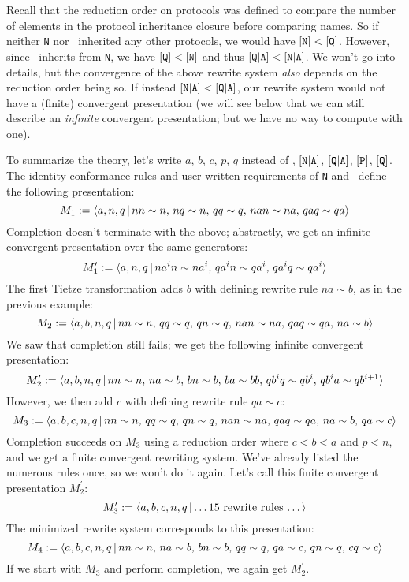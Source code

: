 \documentclass[../generics]{subfiles}
\begin{document}
\begin{example}
Recall that the reduction order on protocols was defined to compare the number of elements in the protocol inheritance closure before comparing names. So if neither \texttt{N} nor \tQ\ inherited any other protocols, we would have $[\texttt{N}]<[\texttt{Q}]$. However, since \tQ\ inherits from \texttt{N}, we have $[\texttt{Q}]<[\texttt{N}]$ and thus $[\texttt{Q}|\texttt{A}]<[\texttt{N}|\texttt{A}]$. We won't go into details, but the convergence of the above rewrite system \emph{also} depends on the reduction order being so. If instead $[\texttt{N}|\texttt{A}]<[\texttt{Q}|\texttt{A}]$, our rewrite system would not have a (finite) convergent presentation (we will see below that we can still describe an \emph{infinite} convergent presentation; but we have no way to compute with one).

\smallskip

To summarize the theory, let's write $a$, $b$, $c$, $p$, $q$ instead of \nA, $[\texttt{N}|\texttt{A}]$, $[\texttt{Q}|\texttt{A}]$, $[\texttt{P}]$, $[\texttt{Q}]$. The identity conformance rules and user-written requirements of \texttt{N} and \tQ\ define the following presentation:
\[M_1 := \langle a,n,q\,|\,nn\sim n,\, nq\sim n,\, qq\sim q,\,nan\sim na,\,qaq\sim qa\rangle\]
Completion doesn't terminate with the above; abstractly, we get an infinite convergent presentation over the same generators:
\[M_1^\prime := \langle a,n,q\,|\,na^in\sim na^i,\, qa^in\sim qa^i,\,qa^iq\sim qa^i\rangle\]
The first Tietze transformation adds $b$ with defining rewrite rule $na\sim b$, as in the previous example:
\[M_2 := \langle a,b,n,q\,|\,nn\sim n,\, qq\sim q,\, qn\sim q,\, nan\sim na,\,qaq\sim qa,\,na\sim b\rangle\]
We saw that completion still fails; we get the following infinite convergent presentation:
\[M_2^{\prime} := \langle a,b,n,q\,|\,nn\sim n,\,na\sim b,\,bn\sim b,\,ba\sim bb,\,qb^iq\sim qb^i,\, qb^ia\sim qb^{i+1}\rangle\]
However, we then add $c$ with defining rewrite rule $qa\sim c$:
\[M_3 := \langle a,b,c,n,q\,|\,nn\sim n,\, qq\sim q,\, qn\sim q,\, nan\sim na,\,qaq\sim qa,\,na\sim b,\,qa\sim c\rangle\]
Completion succeeds on $M_3$ using a reduction order where $c<b<a$ and $p<n$, and we get a finite convergent rewriting system. We've already listed the numerous rules once, so we won't do it again. Let's call this finite convergent presentation $M_2^\prime$:
\[M_3^\prime := \langle a,b,c,n,q\,|\,\mbox{\ldots 15 rewrite rules \ldots}\rangle\]
The minimized rewrite system corresponds to this presentation:
\[M_4 :=\langle a,b,c,n,q\,|\,nn\sim n,\, na\sim b,\, bn\sim b,\, qq\sim q,\, qa\sim c,\, qn\sim q,\, cq\sim c\rangle\]
If we start with $M_3$ and perform completion, we again get $M_2^\prime$.
\end{example}
\end{document}
